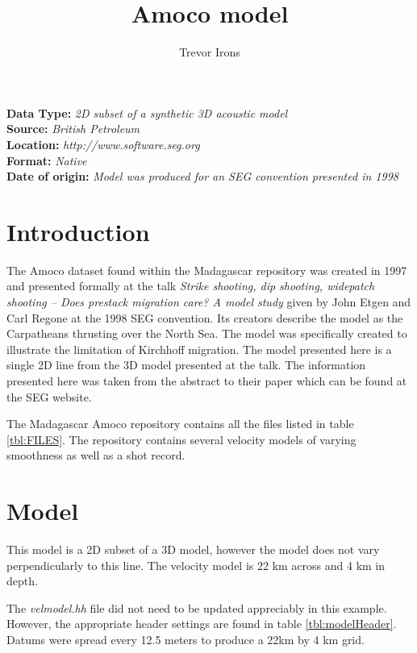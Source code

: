 \title{Amoco model}
\author{Trevor Irons}
\maketitle
\lstset{language=python,numbers=left,numberstyle=\tiny,showstringspaces=false}

\noindent
\textbf {Data Type:} \emph{2D subset of a synthetic 3D acoustic model}\\
\textbf {Source:} \emph{British Petroleum}\\
\textbf {Location:} \emph{http://www.software.seg.org}\\
\textbf {Format:} \emph{Native} \\
\textbf{Date of origin:} \emph{Model was produced for an SEG convention presented in 1998}\\

\section{Introduction}
The Amoco dataset found within the Madagascar repository was created in 1997 and presented 
formally at the talk \emph{Strike shooting, dip shooting, widepatch shooting -- Does prestack 
migration care? A model study} given by John Etgen and Carl Regone at the 1998 SEG convention.  
Its creators describe the model as the Carpatheans thrusting over the North Sea.  
The model was specifically created to illustrate the limitation of Kirchhoff migration.  
The model presented here is a single 2D line from the 3D model presented at the talk.  
The information presented here was taken from the abstract to their paper which can be found at the SEG website.  

The Madagascar Amoco repository contains all the files listed in table \ref{tbl:FILES}.  The repository contains several velocity models of varying smoothness as well as a shot record.   

{
\tiny

\normalsize
}

\section{Model}
This model is a 2D subset of a 3D model, however the model does not vary perpendicularly to this line.  The velocity model is 22 km across and 4 km in depth.

The \emph{velmodel.hh} file did not need to be updated appreciably in this example.  However, the appropriate header settings are found in table \ref{tbl:modelHeader}.  Datums were spread every 12.5 meters to produce a 22km by 4 km grid.  
 
